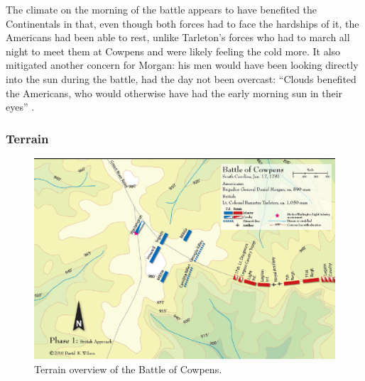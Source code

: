 The climate on the morning of the battle appears to have benefited the
Continentals in that, even though both forces had to face the hardships of it,
the Americans had been able to rest, unlike Tarleton's forces who had to march
all night to meet them at Cowpens and were likely feeling the cold more.  It
also mitigated another concern for Morgan: his men would have been looking
directly into the sun during the battle, had the day not been overcast:
``Clouds benefited the Americans, who would otherwise have had the early
morning sun in their eyes'' \cite[67]{moncure_cowpens_1996}.  

\subsubsection{Terrain}

\begin{figure}[h]
    \begin{center}
    \includegraphics[width=6in]{gfx/futch1}
    \end{center}
    \caption{Terrain overview of the Battle of Cowpens. \cite{wilson_blogmap}}
    \label{terrain1}
\end{figure}

